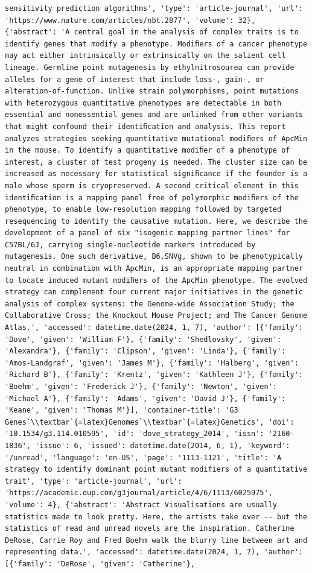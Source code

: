 \documentclass[
  12pt,
]
{article}
\begin{document}
\begin{verbatim}
sensitivity prediction algorithms', 'type': 'article-journal', 'url': 'https://www.nature.com/articles/nbt.2877', 'volume': 32}, {'abstract': 'A central goal in the analysis of complex traits is to identify genes that modify a phenotype. Modiﬁers of a cancer phenotype may act either intrinsically or extrinsically on the salient cell lineage. Germline point mutagenesis by ethylnitrosourea can provide alleles for a gene of interest that include loss-, gain-, or alteration-of-function. Unlike strain polymorphisms, point mutations with heterozygous quantitative phenotypes are detectable in both essential and nonessential genes and are unlinked from other variants that might confound their identiﬁcation and analysis. This report analyzes strategies seeking quantitative mutational modiﬁers of ApcMin in the mouse. To identify a quantitative modiﬁer of a phenotype of interest, a cluster of test progeny is needed. The cluster size can be increased as necessary for statistical signiﬁcance if the founder is a male whose sperm is cryopreserved. A second critical element in this identiﬁcation is a mapping panel free of polymorphic modiﬁers of the phenotype, to enable low-resolution mapping followed by targeted resequencing to identify the causative mutation. Here, we describe the development of a panel of six "isogenic mapping partner lines" for C57BL/6J, carrying single-nucleotide markers introduced by mutagenesis. One such derivative, B6.SNVg, shown to be phenotypically neutral in combination with ApcMin, is an appropriate mapping partner to locate induced mutant modiﬁers of the ApcMin phenotype. The evolved strategy can complement four current major initiatives in the genetic analysis of complex systems: the Genome-wide Association Study; the Collaborative Cross; the Knockout Mouse Project; and The Cancer Genome Atlas.', 'accessed': datetime.date(2024, 1, 7), 'author': [{'family': 'Dove', 'given': 'William F'}, {'family': 'Shedlovsky', 'given': 'Alexandra'}, {'family': 'Clipson', 'given': 'Linda'}, {'family': 'Amos-Landgraf', 'given': 'James M'}, {'family': 'Halberg', 'given': 'Richard B'}, {'family': 'Krentz', 'given': 'Kathleen J'}, {'family': 'Boehm', 'given': 'Frederick J'}, {'family': 'Newton', 'given': 'Michael A'}, {'family': 'Adams', 'given': 'David J'}, {'family': 'Keane', 'given': 'Thomas M'}], 'container-title': 'G3 Genes`\\textbar`{=latex}Genomes`\\textbar`{=latex}Genetics', 'doi': '10.1534/g3.114.010595', 'id': 'dove_strategy_2014', 'issn': '2160-1836', 'issue': 6, 'issued': datetime.date(2014, 6, 1), 'keyword': '/unread', 'language': 'en-US', 'page': '1113-1121', 'title': 'A strategy to identify dominant point mutant modifiers of a quantitative trait', 'type': 'article-journal', 'url': 'https://academic.oup.com/g3journal/article/4/6/1113/6025975', 'volume': 4}, {'abstract': 'Abstract Visualisations are usually statistics made to look pretty. Here, the artists take over -- but the statistics of read and unread novels are the inspiration. Catherine DeRose, Carrie Roy and Fred Boehm walk the blurry line between art and representing data.', 'accessed': datetime.date(2024, 1, 7), 'author': [{'family': 'DeRose', 'given': 'Catherine'}, 
\end{verbatim}
\end{document}
